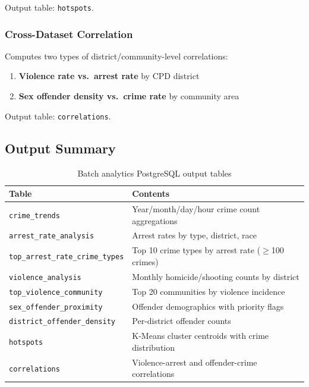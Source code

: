 \documentclass[12pt,a4paper]{article}
\begin{document}
Output table: \texttt{hotspots}.

\subsubsection{Cross-Dataset Correlation}

Computes two types of district/community-level correlations:
\begin{enumerate}
  \item \textbf{Violence rate vs.\ arrest rate} by CPD district
  \item \textbf{Sex offender density vs.\ crime rate} by community area
\end{enumerate}
Output table: \texttt{correlations}.

\subsection{Output Summary}

\begin{table}[H]
\centering
\caption{Batch analytics PostgreSQL output tables}
\label{tab:batch}
\begin{tabularx}{\textwidth}{l X}
\toprule
\textbf{Table} & \textbf{Contents} \\
\midrule
\texttt{crime\_trends} & Year/month/day/hour crime count aggregations \\
\texttt{arrest\_rate\_analysis} & Arrest rates by type, district, race \\
\texttt{top\_arrest\_rate\_crime\_types} & Top 10 crime types by arrest rate ($\geq$100 crimes) \\
\texttt{violence\_analysis} & Monthly homicide/shooting counts by district \\
\texttt{top\_violence\_community} & Top 20 communities by violence incidence \\
\texttt{sex\_offender\_proximity} & Offender demographics with priority flags \\
\texttt{district\_offender\_density} & Per-district offender counts \\
\texttt{hotspots} & K-Means cluster centroids with crime distribution \\
\texttt{correlations} & Violence-arrest and offender-crime correlations \\
\bottomrule
\end{tabularx}
\end{table}

\end{document}
